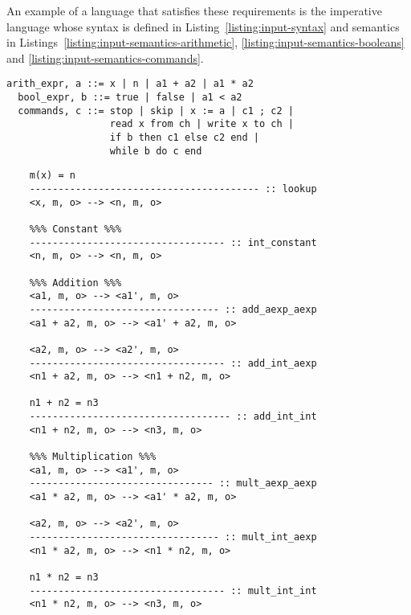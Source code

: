 \documentclass[conference]{IEEEtran}
\begin{document}
An example of a language that satisfies these requirements is the imperative language whose syntax is defined in Listing~\ref{listing:input-syntax} and semantics in Listings~\ref{listing:input-semantics-arithmetic}, \ref{listing:input-semantics-booleans} and \ref{listing:input-semantics-commands}.

\begin{lstlisting}[label=listing:input-syntax,captionpos=b,caption=Ott syntax of a simple imperative language]
  arith_expr, a ::= x | n | a1 + a2 | a1 * a2 
  bool_expr, b ::= true | false | a1 < a2
  commands, c ::= stop | skip | x := a | c1 ; c2 | 
                  read x from ch | write x to ch |
                  if b then c1 else c2 end | 
                  while b do c end

\end{lstlisting}

\begin{lstlisting}[label=listing:input-semantics-arithmetic,captionpos=b,caption=Ott small-step semantics of arithmetic expressions]
	%%% Variable %%%
	m(x) = n
	---------------------------------------- :: lookup
	<x, m, o> --> <n, m, o>

	%%% Constant %%%
	---------------------------------- :: int_constant
	<n, m, o> --> <n, m, o>
	
	%%% Addition %%%
	<a1, m, o> --> <a1', m, o>
	--------------------------------- :: add_aexp_aexp
	<a1 + a2, m, o> --> <a1' + a2, m, o>
	
	<a2, m, o> --> <a2', m, o>
	---------------------------------- :: add_int_aexp
	<n1 + a2, m, o> --> <n1 + n2, m, o>
	
	n1 + n2 = n3
	----------------------------------- :: add_int_int
	<n1 + n2, m, o> --> <n3, m, o>
	
	%%% Multiplication %%%
	<a1, m, o> --> <a1', m, o>
	-------------------------------- :: mult_aexp_aexp
	<a1 * a2, m, o> --> <a1' * a2, m, o>
	
	<a2, m, o> --> <a2', m, o>
	--------------------------------- :: mult_int_aexp
	<n1 * a2, m, o> --> <n1 * n2, m, o>
	
	n1 * n2 = n3
	---------------------------------- :: mult_int_int
	<n1 * n2, m, o> --> <n3, m, o>
\end{lstlisting}
\end{document}
